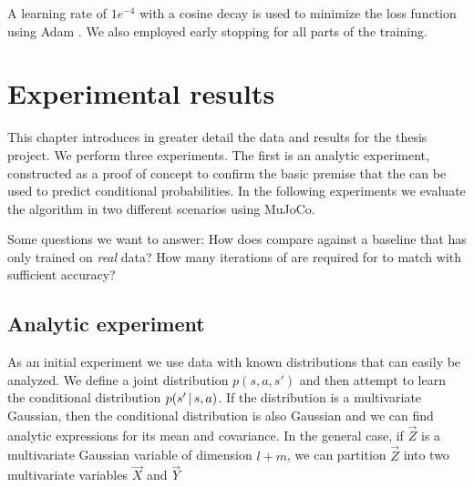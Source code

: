 A learning rate of $1e^{-4}$ with a cosine decay is used to minimize the loss function using Adam \parencite{kingma2014adam}. We also employed early stopping for all parts of the training.





\chapter{Experimental results}
\label{experiments}

This chapter introduces in greater detail the data and results for the thesis project. We perform three experiments. The first is an analytic experiment, constructed as a proof of concept to confirm the basic premise that the \cvae{} can be used to predict conditional probabilities. In the following experiments we evaluate the \dettostoc{} algorithm in two different scenarios using MuJoCo.

Some questions we want to answer: How does \dettostoc{} compare against a baseline that has only trained on \emph{real} data? How many iterations of \dettostoc{} are required for \fdecoder{} to match \fsimulator{} with sufficient accuracy?


\section{Analytic experiment}
\label{exp:analytic}
As an initial experiment we use data with known distributions that can easily be analyzed. We define a joint distribution $p(s,a,s')$ and then attempt to learn the conditional distribution $p\given{s'}{s,a}$. If the distribution is a multivariate Gaussian, then the conditional distribution is also Gaussian and we can find analytic expressions for its mean and covariance. In the general case, if $\vec{Z}$ is a multivariate Gaussian variable of dimension $l+m$, we can partition $\vec{Z}$ into two multivariate variables $\vec{X}$ and $\vec{Y}$

